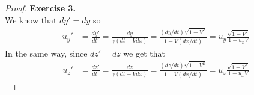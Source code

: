 \documentclass[11pt]{article}
\theoremstyle{definition}
\begin{document}
\cleardoublepage
\begin{proof}{\textbf{Exercise 3.}}\\
We know that $dy' = dy$ so
\begin{align*}
    u_y' &= \frac{dy'}{dt'}
    = \frac{dy}{\gamma(dt - Vdx)}
    = \frac{(dy/dt)\sqrt{1 - V^2}}{1 - V(dx/dt)}
    = u_y\frac{\sqrt{1 - V^2}}{1 - u_xV}
\end{align*}
In the same way, since $dz' = dz$ we get that
\begin{align*}
    u_z' &= \frac{dz'}{dt'}
    = \frac{dz}{\gamma(dt - Vdx)}
    = \frac{(dz/dt)\sqrt{1 - V^2}}{1 - V(dx/dt)}
    = u_z\frac{\sqrt{1 - V^2}}{1 - u_xV}
\end{align*}
\end{proof}
\end{document}
